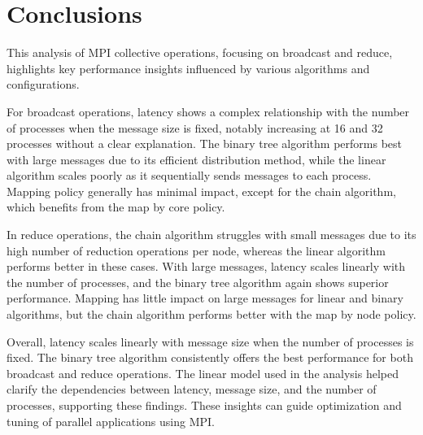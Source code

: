 \section{Conclusions}

This analysis of MPI collective operations, focusing on broadcast and reduce, highlights key performance insights influenced by various algorithms and configurations.

For broadcast operations, latency shows a complex relationship with the number of processes when the message size is fixed, notably increasing at 16 and 32 processes without a clear explanation. The binary tree algorithm performs best with large messages due to its efficient distribution method, while the linear algorithm scales poorly as it sequentially sends messages to each process. Mapping policy generally has minimal impact, except for the chain algorithm, which benefits from the map by core policy.

In reduce operations, the chain algorithm struggles with small messages due to its high number of reduction operations per node, whereas the linear algorithm performs better in these cases. With large messages, latency scales linearly with the number of processes, and the binary tree algorithm again shows superior performance. Mapping has little impact on large messages for linear and binary algorithms, but the chain algorithm performs better with the map by node policy.

Overall, latency scales linearly with message size when the number of processes is fixed. The binary tree algorithm consistently offers the best performance for both broadcast and reduce operations. The linear model used in the analysis helped clarify the dependencies between latency, message size, and the number of processes, supporting these findings. These insights can guide optimization and tuning of parallel applications using MPI.